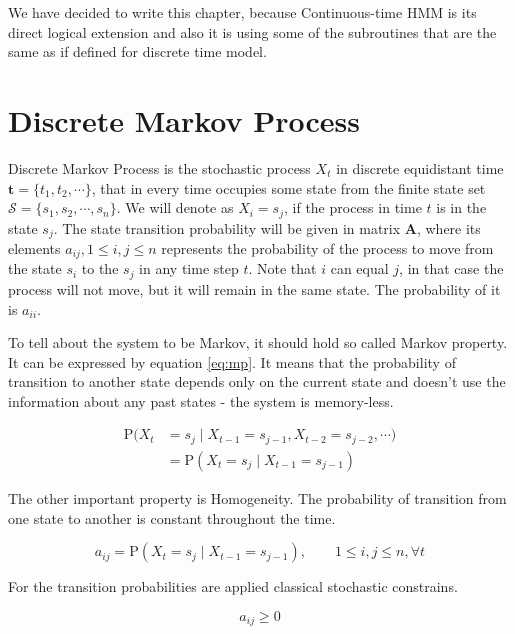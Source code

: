 \documentclass[thesis=M,english]{FITthesis}[2012/10/20]
\newcommand{\matr}[1]{\mathbf{#1}}
\begin{document}
We have decided to write this chapter, because Continuous-time HMM is its direct logical extension and also it is using some of the subroutines that are the same as if defined for discrete time model.

\section{Discrete Markov Process}\label{sec:DMP}
    
Discrete Markov Process is the stochastic process $X_t$ in discrete equidistant time $\matr{t} = \{ t_1,t_2,\cdots \}$, that in every time occupies some state from the finite state set $\mathcal{S} = \{ s_1, s_2, \cdots, s_n\}$. We will denote as $X_i = s_j$, if the process in time $t$ is in the state $s_j$. The state transition probability will be given in matrix $\matr{A}$, where its elements $a_{ij}, 1\leq i,j \leq n$ represents the probability of the process to move from the state $s_i$ to the $s_j$ in any time step $t$.  Note that $i$ can equal $j$, in that case the process will not move, but it  will remain in the same state. The probability of it is $a_{ii}$.

To tell about the system to be Markov, it should hold so called Markov property. It can be expressed by equation \eqref{eq:mp}. It means that the probability of transition to another state depends only on the current state and doesn't use the information about any past states - the system is memory-less.

\begin{equation}\label{eq:mp}
\begin{aligned}
\mathrm{P}(X_t & = s_j \mid X_{t-1} = s_{j-1}, X_{t-2} = s_{j-2}, \cdots)  \\   
               & = \mathrm{P}(X_t = s_j \mid X_{t-1} = s_{j-1} )
\end{aligned}
\end{equation}

The other important property is Homogeneity. The probability of transition from one state to another is constant throughout the time. 

\begin{equation}\label{eq:homo}
   a_{ij} = \mathrm{P}(X_t = s_j \mid X_{t-1} = s_{j-1} ),\qquad 1 \leq i,j \leq n, \forall t
\end{equation}

For the transition probabilities are applied classical stochastic constrains.

\begin{equation}
   a_{ij} \geq 0
\end{equation}
\end{document}
